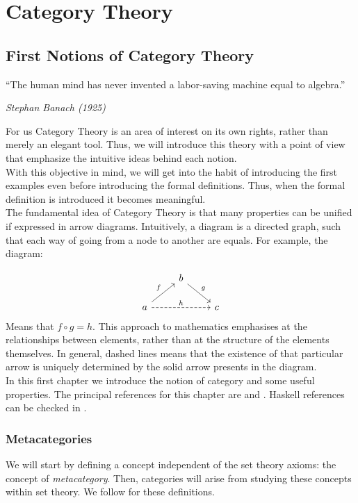
\part{Category Theory}
\label{Part1}



\chapter{First Notions of Category Theory}

\epigraph{“The human mind has never invented a labor-saving machine equal to algebra.” }{\textit{Stephan Banach (1925)}}

For us Category Theory is an area of interest on its own rights, rather than merely an elegant tool. Thus, we will introduce this theory with a point of view that emphasize the intuitive ideas behind each notion.\\

 With this objective in mind, we will get into the habit of introducing the first examples even before introducing the formal definitions. Thus, when the formal definition is introduced it becomes meaningful.\\

The fundamental idea of Category Theory is that many properties can be unified if expressed in arrow diagrams. Intuitively, a diagram is a directed graph, such that each way of going from a node to another are equals. For example, the diagram:

\[
  \begin{tikzcd}
    & b \arrow[rd, "g"]& \\
    a\arrow[ru, "f"] \arrow[rr, "h", dashed] && c
  \end{tikzcd}
\]
Means that $f\circ g = h$. This approach to mathematics emphasises  at the relationships between elements, rather than at the structure of the elements themselves. In general, dashed lines means that the existence of that particular arrow is uniquely determined by the solid arrow presents in the diagram.\\

In this first chapter we introduce the notion of category and some useful properties. The principal references for this chapter are \cite{mac2013categories} and \cite{riehl2017category}. Haskell references can be checked in \cite{milewski2018category}.

\section{Metacategories}
We will start by defining a concept independent of the set theory axioms: the concept of \emph{metacategory}. Then, categories will arise from studying these concepts within set theory. We follow  \cite{mac2013categories} for these definitions.\\


